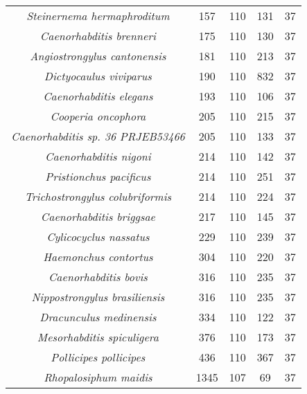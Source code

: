 \begin{longtable}[c]{|c|c|c|c|c|}
\textit{Steinernema hermaphroditum}       & 157  & 110 & 131  & 37 \\
\textit{Caenorhabditis brenneri}          & 175  & 110 & 130  & 37 \\
\textit{Angiostrongylus cantonensis}      & 181  & 110 & 213  & 37 \\
\textit{Dictyocaulus viviparus}           & 190  & 110 & 832  & 37 \\
\textit{Caenorhabditis elegans}           & 193  & 110 & 106  & 37 \\
\textit{Cooperia oncophora}               & 205  & 110 & 215  & 37 \\
\textit{Caenorhabditis sp. 36 PRJEB53466} & 205  & 110 & 133  & 37 \\
\textit{Caenorhabditis nigoni}            & 214  & 110 & 142  & 37 \\
\textit{Pristionchus pacificus}           & 214  & 110 & 251  & 37 \\
\textit{Trichostrongylus colubriformis}   & 214  & 110 & 224  & 37 \\
\textit{Caenorhabditis briggsae}          & 217  & 110 & 145  & 37 \\
\textit{Cylicocyclus nassatus}            & 229  & 110 & 239  & 37 \\
\textit{Haemonchus contortus}             & 304  & 110 & 220  & 37 \\
\textit{Caenorhabditis bovis}             & 316  & 110 & 235  & 37 \\
\textit{Nippostrongylus brasiliensis}     & 316  & 110 & 235  & 37 \\
\textit{Dracunculus medinensis}           & 334  & 110 & 122  & 37 \\
\textit{Mesorhabditis spiculigera}        & 376  & 110 & 173  & 37 \\
\textit{Pollicipes pollicipes}            & 436  & 110 & 367  & 37 \\
\textit{Rhopalosiphum maidis}             & 1345 & 107 & 69   & 37 \\ \hline
\end{longtable}


